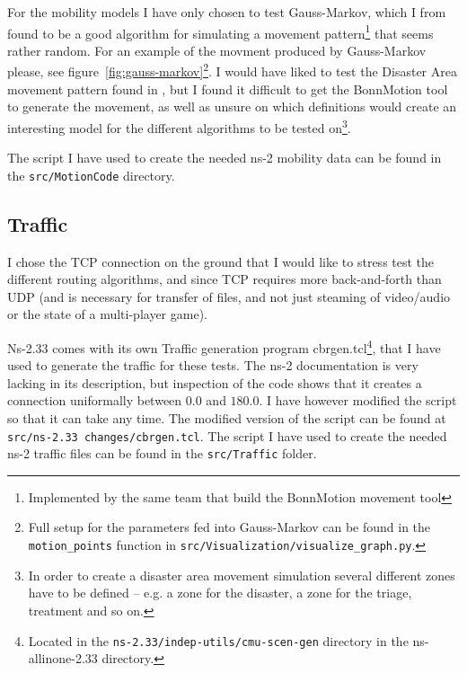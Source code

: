 

For the mobility models I have only chosen to test Gauss-Markov, which I from \cite{MobilityAdHocResearch} found to be a good algorithm for simulating a movement pattern\footnote{Implemented by the same team that build the BonnMotion movement tool} that seems rather random. For an example of the movment produced by Gauss-Markov please, see figure~\ref{fig:gauss-markov}\footnote{Full setup for the parameters fed into Gauss-Markov can be found in the \texttt{motion\_points} function in \texttt{src/Visualization/visualize\_graph.py}.}. I would have liked to test the Disaster Area movement pattern found in \cite{disasterArea}, but I found it difficult to get the BonnMotion tool to generate the movement, as well as unsure on which definitions would create an interesting model for the different algorithms to be tested on\footnote{In order to create a disaster area movement simulation several different zones have to be defined -- e.g. a zone for the disaster, a zone for the triage, treatment and so on.}. 

The script I have used to create the needed ns-2 mobility data can be found in the \texttt{src/MotionCode} directory.

\subsection{Traffic}
\label{section:traffic_model}
I chose the TCP connection on the ground that I would like to stress test the different routing algorithms, and since TCP requires more back-and-forth than UDP (and is necessary for transfer of files, and not just steaming of video/audio or the state of a multi-player game).

Ns-2.33 comes with its own Traffic generation program cbrgen.tcl\footnote{Located in the \texttt{ns-2.33/indep-utils/cmu-scen-gen} directory in the ns-allinone-2.33 directory.}, that I have used to generate the traffic for these tests. The ns-2 documentation is very lacking in its description, but inspection of the code shows that it creates a connection uniformally between $0.0$ and $180.0$. I have however modified the script so that it can take any time. The modified version of the script can be found at \texttt{src/ns-2.33 changes/cbrgen.tcl}. The script I have used to create the needed ns-2 traffic files can be found in the \texttt{src/Traffic} folder.

